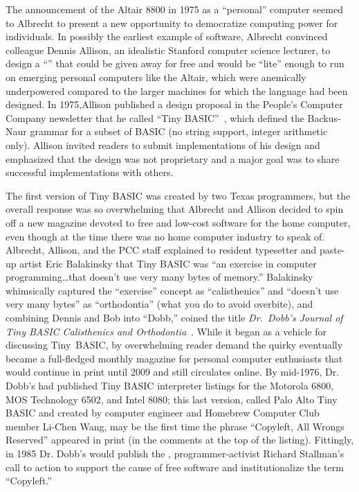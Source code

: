 The announcement of the Altair 8800 in 1975 as a ``personal'' computer
seemed to Albrecht to present a new opportunity to democratize computing
power for individuals.
In possibly the earliest example of  software, Albrecht
convinced colleague Dennis Allison, an idealistic Stanford computer
science lecturer, to design a ``'' that could be given
away for free and would be ``lite'' enough to run on emerging personal
computers like the Altair, which were anemically underpowered compared
to the larger machines for which the language had been designed.
In 1975,Allison published a design proposal in the People's Computer
Company newsletter that he called ``Tiny
BASIC''~\cite{allison_tiny_basic}, which defined the Backus-Naur grammar
for a subset of BASIC (no string support, integer arithmetic only).
Allison invited readers to submit implementations of his design and
emphasized that the design was not proprietary and a major goal was to
share successful implementations with others.

The first version of Tiny BASIC was created by two Texas programmers,
but the overall response was so overwhelming that Albrecht and Allison
decided to spin off a new magazine devoted to free and low-cost software
for the home computer, even though at the time there was no home
computer industry to speak of.
Albrecht, Allison, and the PCC staff explained to resident typesetter
and paste-up artist Eric Balakinsky that Tiny BASIC was ``an exercise in
computer programming\ldots{}that doesn't use very many bytes of
memory.''
Balakinsky whimsically captured the ``exercise'' concept as
``calisthenics'' and ``doesn't use very many bytes'' as ``orthodontia''
(what you do to avoid overbite), and combining Dennis and Bob into
``Dobb,'' coined the title \emph{Dr.~Dobb's Journal of Tiny BASIC
Calisthenics and Orthodontia}~\cite[p.~265]{dormouse}.
While it began as a vehicle for discussing Tiny~BASIC, by overwhelming
reader demand the quirky  eventually became a
full-fledged monthly magazine for personal computer enthusiasts that
would continue in print until 2009 and still circulates online.
By mid-1976, Dr. Dobb's had published Tiny BASIC interpreter listings
for the Motorola 6800, MOS Technology 6502, and Intel 8080; this last
version, called Palo Alto Tiny BASIC and created by computer engineer
and Homebrew Computer Club member Li-Chen Wang, may be the first time
the phrase ``Copyleft, All Wrongs Reserved'' appeared in print (in the
comments at the top of the listing).
Fittingly, in 1985 Dr. Dobb's would publish the ,
programmer-activist Richard Stallman's call to action to support the
cause of free software and institutionalize the term ``Copyleft.''


